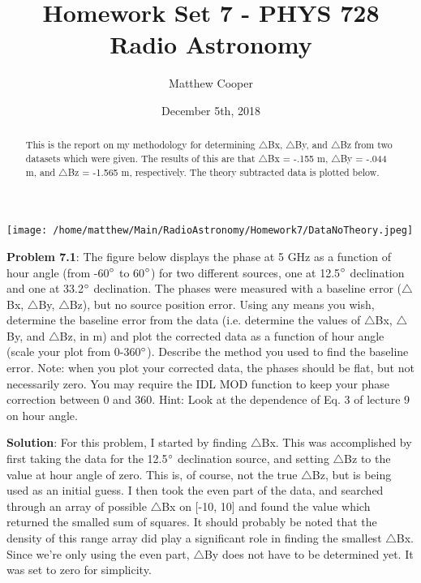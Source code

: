 \documentclass{article}
\title{Homework Set 7 - PHYS 728 Radio Astronomy}
\author{Matthew Cooper}
\date{December 5th, 2018}
\begin{document}
\begin{titlingpage}
    \maketitle
    \begin{abstract}
	This is the report on my methodology for determining $\triangle$Bx, $\triangle$By, and 		$\triangle$Bz from two datasets which were given.  The results of this are that $		 	\triangle$Bx = -.155 m, $\triangle$By = -.044 m, and $\triangle$Bz = -1.565 m, 			 	respectively.  The theory subtracted data is plotted below.
    \end{abstract}
	\texttt{[image: /home/matthew/Main/RadioAstronomy/Homework7/DataNoTheory.jpeg]}


\end{titlingpage}

\textbf{Problem 7.1}:  The figure below displays the phase at 5 GHz as a function of hour angle (from -60$\degree$ to 60$\degree$) for two different sources, one at 12.5$\degree$ declination and one at 33.2$\degree$ declination. The phases were measured with a baseline error ($\triangle$Bx, $\triangle$By, $\triangle$Bz), but no source position error.  Using any means you wish, determine the baseline error from the data (i.e. determine the values of $\triangle$Bx, $\triangle$By, and $\triangle$Bz, in m) and plot the corrected data as a function of hour angle (scale your plot from 0-360$\degree$). Describe the method you used to find the baseline error. Note: when you plot your corrected data, the phases should be flat, but not necessarily zero. You may require the IDL MOD function to keep your phase correction between 0 and 360. Hint: Look at the dependence of Eq. 3 of lecture 9 on hour angle.

\bigskip
\textbf{Solution}:  For this problem, I started by finding $\triangle$Bx.  This was accomplished by first taking the data for the 12.5$\degree$ declination source, and setting $\triangle$Bz to the value at hour angle of zero.  This is, of course, not the true $\triangle$Bz, but is being used as an initial guess.  I then took the even part of the data, and searched through an array of possible $\triangle$Bx on [-10, 10] and found the value which returned the smalled sum of squares.  It should probably be noted that the density of this range array did play a significant role in finding the smallest $\triangle$Bx.  Since we're only using the even part, $\triangle$By does not have to be determined yet.  It was set to zero for simplicity.
\end{document}
